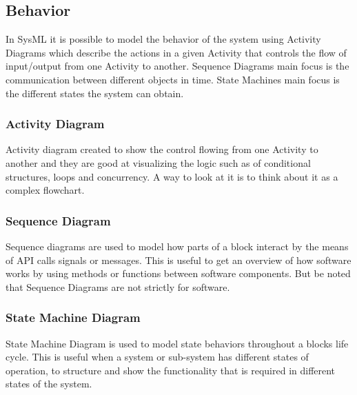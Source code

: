 \subsection{Behavior}\label{sc:behavior}
In SysML it is possible to model the behavior of the system using Activity Diagrams which describe the actions in a given Activity that controls the flow of input/output from one Activity to another. Sequence Diagrams main focus is the communication between different objects in time. State Machines main focus is the different states the system can obtain.

\subsubsection{Activity Diagram}\label{ssc:activitydiagram}
Activity diagram created to show the control flowing from one Activity to another and they are good at visualizing the logic such as of conditional structures, loops and concurrency. A way to look at it is to think about it as a complex flowchart.

\subsubsection{Sequence Diagram}\label{ssc:sequencediagram}
Sequence diagrams are used to model how parts of a block interact by the means of API calls signals or messages. This is useful to get an overview of how software works by using methods or functions between software components. But be noted that Sequence Diagrams are not strictly for software.

\subsubsection{State Machine Diagram}\label{ssc:statemachinediagram}
State Machine Diagram is used to model state behaviors throughout a blocks life cycle. This is useful when a system or sub-system has different states of operation, to structure and show the functionality that is required in different states of the system.